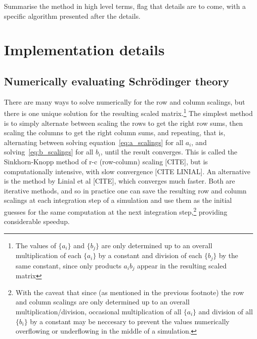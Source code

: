 Summarise the method in high level terms, flag that details are to come, with a specific algorithm presented after the details.

\section{Implementation details}

\subsection{Numerically evaluating Schr\"odinger theory}

There are many ways to solve numerically for the row and column scalings, but there is one unique solution for the resulting scaled matrix.\footnote{The values of $\{a_i\}$ and $\{b_j\}$ are only determined up to an overall multiplication of each $\{a_i\}$ by a constant and division of each $\{b_j\}$ by the same constant, since only products $a_i b_j$ appear in the resulting scaled matrix} The simplest method is to simply alternate between scaling the rows to get the right row sums, then scaling the columns to get the right column sums, and repeating, that is, alternating between solving equation~\eqref{eq:a_scalings} for all $a_i$, and solving~\eqref{eq:b_scalings} for all $b_i$, until the result converges. This is called the Sinkhorn-Knopp method of r-c (row-column) scaling [CITE], but is computationally intensive, with slow convergence [CITE LINIAL]. An alternative is the method by Linial et al [CITE], which converges much faster. Both are iterative methods, and so in practice one can save the resulting row and column scalings at each integration step of a simulation and use them as the initial guesses for the same computation at the next integration step,\footnote{With the caveat that since (as mentioned in the previous footnote) the row and column scalings are only determined up to an overall multiplication/division, occasional multiplication of all $\{a_i\}$ and division of all $\{b_i\}$ by a constant may be neccesary to prevent the values numerically overflowing or underflowing in the middle of a simulation.} providing considerable speedup.

